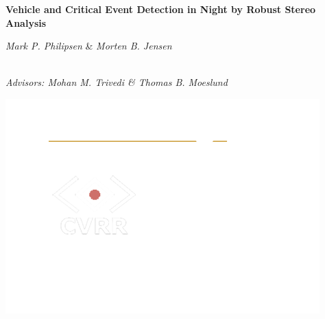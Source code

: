 \documentclass[paperwidth=36in,paperheight=27in,landscape,11pt]{preambles/baposter}
\begin{document}
\begin{poster}
{ 
}
{\color{white}\bf
 \LARGE{
  Vehicle and Critical Event Detection in Night by Robust Stereo Analysis
 }
}
{\color{white}\scriptsize
  \vspace{0.7em} \begin{large} \textit{Mark P. Philipsen} \& \textit{Morten B. Jensen} \end{large} \\[0.7em]
\small\textit{Advisors: Mohan M. Trivedi \& Thomas B. Moeslund}
}
{
  \includegraphics[height=0.75\headerheight]{preambles/all.png}
%
%
%
%  



}
\end{poster}
\end{document}
